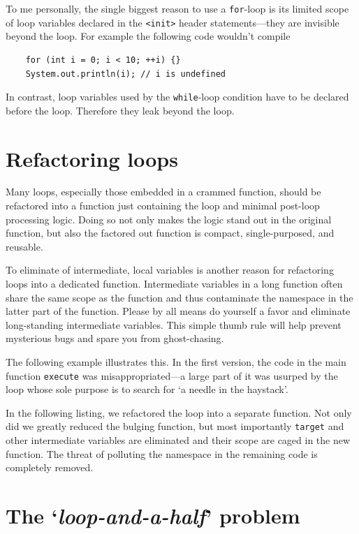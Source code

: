 \documentclass[oneside,11pt]{book}
\theoremstyle{definition}
\theoremstyle{remark}
\newcommand{\code}[1]{\mbox{\lstinline{#1}}}
\begin{document}
To me personally, the single biggest reason to use a \code{for}-loop is its limited scope of
loop variables declared in the \code{<init>} header statements---they are invisible beyond the loop.
For example the following code wouldn't compile
\begin{lstlisting}
    for (int i = 0; i < 10; ++i) {}
    System.out.println(i); // i is undefined
\end{lstlisting}
In contrast, loop variables used by the \code{while}-loop condition have to be declared
before the loop.
Therefore they leak beyond the loop.





\section{Refactoring loops}\label{sec:refactoringLoops}

Many loops, especially those embedded in a crammed function, should be
refactored into a function just containing the loop and minimal post-loop processing logic.
Doing so not only makes the logic stand out in the original function,
but also the factored out function is compact, single-purposed, and reusable.

To eliminate of intermediate, local variables is another reason for refactoring loops into a
dedicated function.
Intermediate variables in a long function often share the same scope as the function
and thus contaminate the namespace in the latter part of the function.
Please by all means do yourself a favor and eliminate long-standing intermediate variables.
This simple thumb rule will help prevent mysterious bugs and spare you from ghost-chasing.


The following example illustrates this.
In the first version, the code in the main function \code{execute} was
misappropriated---a large part of it was usurped by the loop whose sole purpose
is to search for `a needle in the haystack'.

In the following listing, we refactored the loop into a separate function.
Not only did we greatly reduced the bulging function, but most importantly
\code{target} and other intermediate variables are eliminated and
their scope are caged in the new function.
The threat of polluting the namespace in the remaining code is completely removed.



\section{The `\textit{loop-and-a-half}' problem}\label{sec:loop-and-a-half-Problem}
\end{document}
